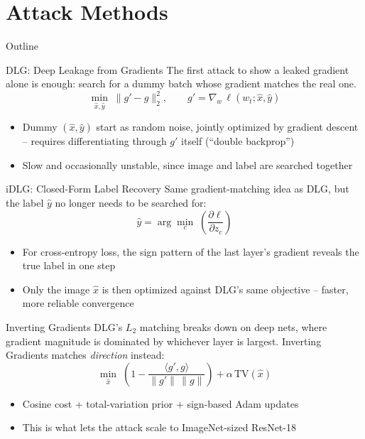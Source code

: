 \documentclass[aspectratio=169,xcolor=dvipsnames]{beamer}
\begin{document}

\section{Attack Methods}

\begin{frame}{Outline}
\tableofcontents[currentsection]
\end{frame}


\begin{frame}{DLG: Deep Leakage from Gradients}
The first attack to show a leaked gradient alone is enough: search for a dummy batch
whose gradient matches the real one.
\[
\min_{\hat{x}, \hat{y}} \; \big\lVert g' - g \big\rVert_2^2,
\qquad g' = \nabla_w \, \ell(w_t; \hat{x}, \hat{y})
\]
\begin{itemize}
\item Dummy $(\hat{x}, \hat{y})$ start as random noise, jointly optimized by gradient
descent -- requires differentiating through $g'$ itself (``double backprop'')
\item Slow and occasionally unstable, since image and label are searched together
\end{itemize}
\end{frame}


\begin{frame}{iDLG: Closed-Form Label Recovery}
Same gradient-matching idea as DLG, but the label $\hat y$ no longer needs to be
searched for:
\[
\hat{y} = \arg\min_{c} \; \left(\frac{\partial \ell}{\partial z_c}\right)
\]
\begin{itemize}
\item For cross-entropy loss, the sign pattern of the last layer's gradient reveals the
true label in one step
\item Only the image $\hat{x}$ is then optimized against DLG's same objective -- faster,
more reliable convergence
\end{itemize}
\end{frame}


\begin{frame}{Inverting Gradients}
DLG's $L_2$ matching breaks down on deep nets, where gradient magnitude is dominated by
whichever layer is largest. Inverting Gradients matches \emph{direction} instead:
\[
\min_{\hat{x}} \; \left(1 - \frac{\langle g', g \rangle}{\lVert g' \rVert \, \lVert g \rVert}\right)
+ \alpha \, \mathrm{TV}(\hat{x})
\]
\begin{itemize}
\item Cosine cost + total-variation prior + sign-based Adam updates
\item This is what lets the attack scale to ImageNet-sized ResNet-18
\end{itemize}
\end{frame}
\end{document}
